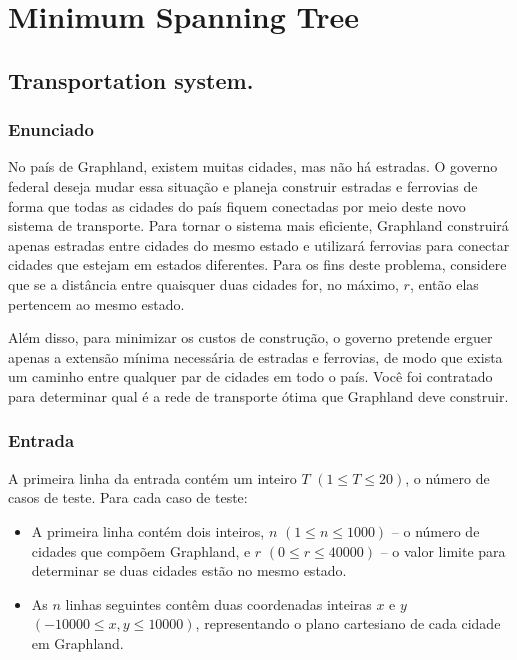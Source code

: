 \section{Minimum Spanning Tree}

\subsection{Transportation system.}

\subsubsection*{Enunciado}
No país de Graphland, existem muitas cidades, mas não há estradas. O governo federal deseja mudar essa situação e planeja construir estradas e ferrovias de forma que todas as cidades do país fiquem conectadas por meio deste novo sistema de transporte. Para tornar o sistema mais eficiente, Graphland construirá apenas estradas entre cidades do mesmo estado e utilizará ferrovias para conectar cidades que estejam em estados diferentes. Para os fins deste problema, considere que se a distância entre quaisquer duas cidades for, no máximo, \(r\), então elas pertencem ao mesmo estado.

Além disso, para minimizar os custos de construção, o governo pretende erguer apenas a extensão mínima necessária de estradas e ferrovias, de modo que exista um caminho entre qualquer par de cidades em todo o país. Você foi contratado para determinar qual é a rede de transporte ótima que Graphland deve construir.

\subsubsection*{Entrada}
A primeira linha da entrada contém um inteiro \(T\) \((1 \le T \le 20)\), o número de casos de teste.  
Para cada caso de teste:
\begin{itemize}
    \item A primeira linha contém dois inteiros, \(n\) \((1 \le n \le 1000)\) – o número de cidades que compõem Graphland, e \(r\) \((0 \le r \le 40000)\) – o valor limite para determinar se duas cidades estão no mesmo estado.
    \item As \(n\) linhas seguintes contêm duas coordenadas inteiras \(x\) e \(y\) \(( -10000 \le x, y \le 10000 )\), representando o plano cartesiano de cada cidade em Graphland.
\end{itemize}

